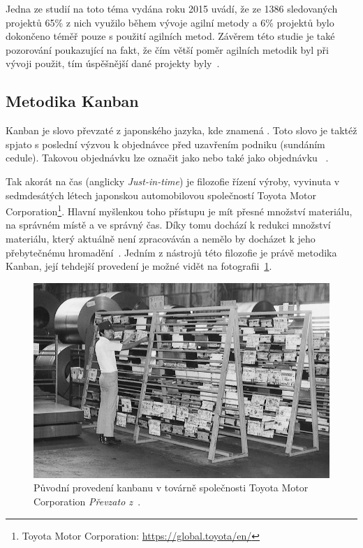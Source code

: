 Jedna ze studií na toto téma vydána roku 2015 uvádí, že ze 1386 sledovaných projektů 65\% z nich využilo během vývoje agilní metody a 6\% projektů bylo dokončeno téměř pouze s použití agilních metod. Závěrem této studie je také pozorování poukazující na fakt, že čím větší poměr agilních metodik byl při vývoji použit, tím úspěšnější dané projekty byly~\cite{bib:agile-work}.

\subsection{Metodika Kanban}
Kanban je slovo převzaté z japonského jazyka, kde znamená . Toto slovo je taktéž spjato s poslední výzvou k objednávce před uzavřením podniku (sundáním cedule). Takovou objednávku lze označit jako  nebo také jako objednávku ~\cite{bib:dict-kanban}. 

Tak akorát na čas (anglicky \emph{Just-in-time}) je filozofie řízení výroby, vyvinuta v sedmdesátých létech japonskou automobilovou společností Toyota Motor Corporation\footnote{Toyota Motor Corporation: \url{https://global.toyota/en/}}. Hlavní myšlenkou toho přístupu je mít přesné množství materiálu, na správném místě a ve správný čas. Díky tomu dochází k redukci množství materiálu, který aktuálně není zpracováván a nemělo by docházet k jeho přebytečnému hromadění~\cite{bib:just-in-time}. Jedním z nástrojů této filozofie je právě metodika Kanban, její tehdejší provedení je možné vidět na fotografii~\ref{img:kanban-toyota}.

\begin{figure}[H]
	\centering
	\includegraphics[width=\textwidth]{obrazky-figures/toyota-kanban.jpg}
	\caption{Původní provedení kanbanu v továrně společnosti Toyota Motor Corporation \emph{Převzato z~\cite{bib:toyota-history}}.}
	\label{img:kanban-toyota}
\end{figure}

